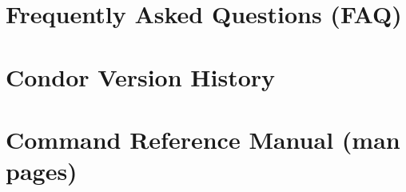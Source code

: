 \documentclass[titlepage,oneside]{book}
\begin{document}
\chapter{Frequently Asked Questions (FAQ)}
\label{sec:FAQ}


\chapter{Condor Version History}
\label{Version-History}


\chapter{Command Reference Manual (man pages)}
\label{sec:command-reference}


%
%
  \fancyhead[LE,RO]{\thepage}
  \fancyhead[RE]{\leftmark}
  \fancyhead[LO]{\rightmark}

\backmatter
{}
\label{index}
\printindex
\end{document}
